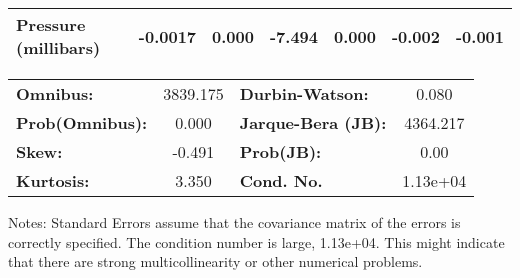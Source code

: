 \begin{center}
\begin{tabular}{lcccccc}
\textbf{Pressure (millibars)}   &      -0.0017  &        0.000     &    -7.494  &         0.000        &       -0.002    &       -0.001     \\
\bottomrule
\end{tabular}
\begin{tabular}{lclc}
\textbf{Omnibus:}       & 3839.175 & \textbf{  Durbin-Watson:     } &    0.080  \\
\textbf{Prob(Omnibus):} &   0.000  & \textbf{  Jarque-Bera (JB):  } & 4364.217  \\
\textbf{Skew:}          &  -0.491  & \textbf{  Prob(JB):          } &     0.00  \\
\textbf{Kurtosis:}      &   3.350  & \textbf{  Cond. No.          } & 1.13e+04  \\
\bottomrule
\end{tabular}
\end{center}

Notes: \newline
 [1] Standard Errors assume that the covariance matrix of the errors is correctly specified. \newline
 [2] The condition number is large, 1.13e+04. This might indicate that there are \newline
 strong multicollinearity or other numerical problems.